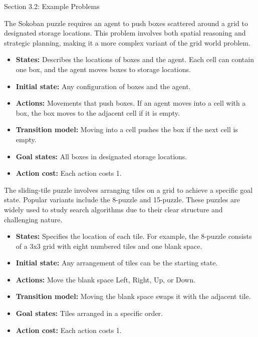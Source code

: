 \begin{notes}{Section 3.2: Example Problems}
    \begin{highlight}
        The Sokoban puzzle requires an agent to push boxes scattered around a grid to designated storage locations. This problem involves both spatial reasoning and strategic planning, making it a more 
        complex variant of the grid world problem.
    
        \begin{itemize}
            \item \textbf{States:} Describes the locations of boxes and the agent. Each cell can contain one box, and the agent moves boxes to storage locations.
            \item \textbf{Initial state:} Any configuration of boxes and the agent.
            \item \textbf{Actions:} Movements that push boxes. If an agent moves into a cell with a box, the box moves to the adjacent cell if it is empty.
            \item \textbf{Transition model:} Moving into a cell pushes the box if the next cell is empty.
            \item \textbf{Goal states:} All boxes in designated storage locations.
            \item \textbf{Action cost:} Each action costs 1.
        \end{itemize}
    \end{highlight}

    \begin{highlight}
        The sliding-tile puzzle involves arranging tiles on a grid to achieve a specific goal state. Popular variants include the 8-puzzle and 15-puzzle. These puzzles are widely used to study search 
        algorithms due to their clear structure and challenging nature.
    
        \begin{itemize}
            \item \textbf{States:} Specifies the location of each tile. For example, the 8-puzzle consists of a 3x3 grid with eight numbered tiles and one blank space.
            \item \textbf{Initial state:} Any arrangement of tiles can be the starting state.
            \item \textbf{Actions:} Move the blank space Left, Right, Up, or Down.
            \item \textbf{Transition model:} Moving the blank space swaps it with the adjacent tile.
            \item \textbf{Goal states:} Tiles arranged in a specific order.
            \item \textbf{Action cost:} Each action costs 1.
        \end{itemize}
    \end{highlight}


\end{notes}
